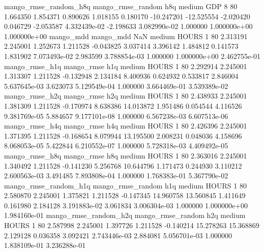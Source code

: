 mango_rmse_random_h8q mango_rmse_random                  h8q     medium      GDP                 8 80  1.664350       1.854371 0.890626       1.018155    0.180170    -10.247201    -12.525554    -2.020420       0.046729 -2.053587 4.332439e-02    -2.198633   3.082990e-02            1.000000    1.000000e+00        1.000000e+00
            mango_mdd         mango_mdd                  NaN     medium    HOURS                 1 80  2.313191       2.245001 1.252673       1.211528   -0.043825      3.037414      3.396142     1.484812       0.141573  1.831902 7.073493e-02     2.983599   3.788854e-03            1.000000    1.000000e+00        2.462755e-01
       mango_rmse_h1q        mango_rmse                  h1q     medium    HOURS                 1 80  2.292914       2.245001 1.313307       1.211528   -0.132948      2.134184      8.400936     0.624932       0.533817  2.846004 5.637645e-03     3.623073   5.129549e-04            1.000000    3.664469e-01        3.539389e-02
       mango_rmse_h2q        mango_rmse                  h2q     medium    HOURS                 1 80  2.438933       2.245001 1.381309       1.211528   -0.170974      8.638386     14.013872     1.951486       0.054544  4.116526 9.381769e-05     5.884657   9.177101e-08            1.000000    6.567238e-03        6.607513e-06
       mango_rmse_h4q        mango_rmse                  h4q     medium    HOURS                 1 80  2.426396       2.245001 1.371395       1.211528   -0.168654      8.079944     13.195500     2.008231       0.048036  4.158696 8.068053e-05     5.422844   6.210552e-07            1.000000    5.728318e-03        4.409492e-05
       mango_rmse_h8q        mango_rmse                  h8q     medium    HOURS                 1 80  2.363016       2.245001 1.340492       1.211528   -0.141230      5.256768     10.644796     1.171473       0.244930  3.110212 2.600563e-03     3.491485   7.893808e-04            1.000000    1.768383e-01        5.367790e-02
mango_rmse_random_h1q mango_rmse_random                  h1q     medium    HOURS                 1 80  2.580870       2.245001 1.375821       1.211528   -0.147345     14.960758     13.560845     1.411649       0.161980  2.184128 3.191883e-02     3.061834   3.006304e-03            1.000000    1.000000e+00        1.984160e-01
mango_rmse_random_h2q mango_rmse_random                  h2q     medium    HOURS                 1 80  2.587998       2.245001 1.397726       1.211528   -0.140214     15.278263     15.368869     2.129128       0.036358  3.092421 2.743446e-03     2.884081   5.056701e-03            1.000000    1.838109e-01        3.236288e-01

